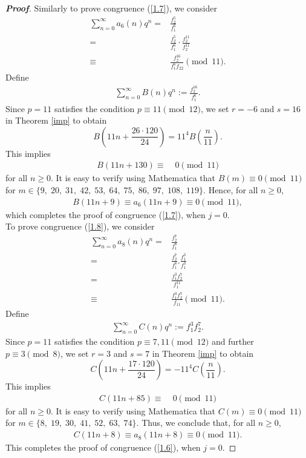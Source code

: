 \documentclass[a4paper,12pt,reqno]{amsart}
\numberwithin{equation}{section}
\begin{document}
\begin{proof}[\it\textbf{Proof}]
	Similarly to prove congruence (\ref{1.7}), we consider
	\begin{align*}
		\sum_{n=0}^{\infty}a_{6}(n)q^n=&\frac{f_2^{5}}{f_1^{6}}\\
		=&\frac{f_2^{5}}{f_1^{6}}\cdot \frac{f_2^{11}}{f_2^{11}}\\
		\equiv&\frac{f_2^{16}}{f_1^{6}f_{22}}\pmod{11}.
	\end{align*}
	Define 
	\begin{align*}
		\sum_{n=0}^{\infty}B(n)q^n := \frac{f_2^{16}}{f_1^6}.
	\end{align*}
	Since $p=11$ satisfies the condition $p\equiv11\pmod{12}$, we set $r=-6$ and $s=16$ in Theorem \ref{imp} to obtain
		$$B\left( 11n + \frac{26\cdot 120}{24}\right)=
		{11}^4 B\left(\frac{n}{11}\right).$$
	This implies
	\begin{align*}
		B\left( 11n + 130\right)\equiv&\; 0\pmod{11}
	\end{align*}
	for all $n\geq 0$.  
	It is easy to verify  using Mathematica that $B(m)\equiv 0 \pmod{11}$ for $m\in \{9,\;20,\; 31,\; 42, \;53,\; 64, \;75,\;86,\;97,\;108,\;119\}$. Hence, for all $n\geq 0$, 
	\begin{align*}
		B\left( 11n + 9\right) \equiv a_6(11n+9)\equiv 0 \pmod{11},
	\end{align*}
	which completes the proof of congruence (\ref{1.7}), when $j=0$.\\
	To prove congruence (\ref{1.8}), we consider
	\begin{align*}
		\sum_{n=0}^{\infty}a_{8}(n)q^n=&\frac{f_2^{7}}{f_1^{8}}\\
		=&\frac{f_2^{7}}{f_1^{8}}.\frac{f_1^3}{f_1^3}\\
		=&\frac{f_1^3f_2^7}{f_1^{11}}\\
		\equiv&\frac{f_1^3f_2^7}{f_{11}}\pmod{11}.
	\end{align*}
	Define
	\begin{align*}
		\sum_{n=0}^{\infty}C(n)q^n := {f_1^3}{f_2^7}.
	\end{align*}
	Since $p=11$ satisfies the condition $p\equiv7, 11\pmod{12}$ and further $p\equiv3\pmod{8}$, we set $r=3$ and $s=7$ in Theorem \ref{imp} to obtain 
	$$C\left( 11n + \frac{17\cdot 120}{24}\right)=-{11}^4 C\left(\frac{n}{11}\right).$$
	This implies
	\begin{align*}
		C\left( 11n + 85\right)\equiv&\; 0\pmod{11}
	\end{align*}
	for all $n\geq 0$.  
	It is easy to verify  using Mathematica that $C(m)\equiv 0 \pmod{11}$ for $m\in \{8,\;19,\;30,\;41,\;52,\;63,\;74\}$.  
	Thus, we conclude that, for all $n\geq 0$, 
	\begin{align*}
		C\left( 11n + 8\right) \equiv a_8(11n+8)\equiv 0 \pmod{11}.
	\end{align*}
	This completes the proof of congruence (\ref{1.6}), when $j=0$.
	

\end{proof}
\end{document}
